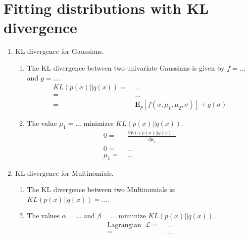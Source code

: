 \section{Fitting distributions with KL divergence}

\begin{enumerate}
\item KL divergence for Gaussians.
  \begin{enumerate}
  \item The KL divergence between two univariate Gaussians is given by
    $f = \ldots$ and $g = \ldots$.
    \begin{align*}
      KL(p(x) || q(x)) =&\; \ldots \\
      =&\; \ldots \\
      =&\; \mathbf{E}_p[ f(x, \mu_1, \mu_2, \sigma)] + g(\sigma)
    \end{align*}
  \item The value $\mu_1 = \ldots$ minimizes $KL(p(x)||q(x))$.
    \begin{align*}
      0 =&\; \frac{\partial KL(p(x) || q(x))}{\partial \mu_1} \\
      0 =&\; \ldots \\
      \mu_1 =&\; \ldots
    \end{align*}
  \end{enumerate}

\item KL divergence for Multinomials.
  \begin{enumerate}
  \item The KL divergence between two Multinomials is: $KL(p(x) || q(x)) = \ldots$.

  \item The values $\alpha = \ldots$ and $\beta = \ldots$ minimize $KL(p(x)||q(x))$.
    \begin{align*}
      \textrm{Lagrangian}\;\; \mathcal{L} =&\; \ldots \\
      =&\; \ldots
    \end{align*}
  \end{enumerate}
\end{enumerate}
